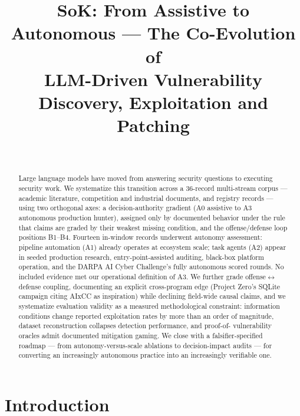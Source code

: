 \documentclass[conference,compsoc]{IEEEtran}
\begin{document}
\title{SoK: From Assistive to Autonomous --- The Co-Evolution of\\ LLM-Driven Vulnerability Discovery, Exploitation and Patching}

\author{\\
}

\maketitle

\begin{abstract}
Large language models have moved from answering security questions to executing security work.
We systematize this transition across a 36-record multi-stream corpus --- academic literature,
competition and industrial documents, and registry records --- using two orthogonal axes: a
decision-authority gradient (A0 assistive to A3 autonomous production hunter), assigned only by
documented behavior under the rule that claims are graded by their weakest missing condition,
and the offense/defense loop positions B1--B4. Fourteen in-window records underwent autonomy
assessment: pipeline automation (A1) already operates at ecosystem scale; task agents (A2)
appear in seeded production research, entry-point-assisted auditing, black-box platform
operation, and the DARPA AI Cyber Challenge's fully autonomous scored rounds. No included
evidence met our operational definition of A3. We further grade offense$\leftrightarrow$
defense coupling, documenting an explicit cross-program edge (Project Zero's SQLite campaign
citing AIxCC as inspiration) while declining field-wide causal claims, and we systematize
evaluation validity as a measured methodological constraint: information conditions change reported exploitation
rates by more than an order of magnitude, dataset reconstruction collapses detection performance, and proof-of-
vulnerability oracles admit documented mitigation gaming. We close with a falsifier-specified
roadmap --- from autonomy-versus-scale ablations to decision-impact audits --- for converting an
increasingly autonomous practice into an increasingly verifiable one.
\end{abstract}

\section{Introduction}
\label{sec:intro}
\end{document}

